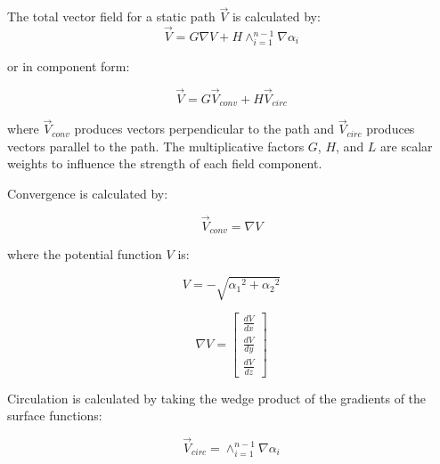 \documentclass[conf]{new-aiaa}
\begin{document}

The total vector field for a static path $\overrightarrow{V}$ is calculated by:
\begin{equation}\label{eq:GVF}
\overrightarrow{V} = G \nabla V + H \wedge_{i=1}^{n-1}\nabla\alpha_i
\end{equation}

or in component form:

\begin{equation}\label{eq:simpleGVF}
\overrightarrow{V} = G\overrightarrow{V}_{conv} + H\overrightarrow{V}_{circ} 
\end{equation}	

where $\overrightarrow{V}_{conv}$ produces vectors perpendicular to the path and $\overrightarrow{V}_{circ}$ produces vectors parallel to the path. The multiplicative factors $G$, $H$, and $L$ are scalar weights to influence the strength of each field component.

Convergence is calculated by:

\begin{equation}
\overrightarrow{V}_{conv} = \nabla V  
\label{convOnly}
\end{equation}

where the potential function $V$ is:

\begin{equation}
V = -\sqrt{{\alpha_1}^2 + {\alpha_2}^2}
\end{equation}

\begin{equation}
\label{eq:gradV}
\nabla V =\begin{bmatrix}
\frac{dV}{dx} \\
\frac{dV}{dy} \\
\frac{dV}{dz}
\end{bmatrix}
\end{equation}



Circulation is calculated by taking the wedge product of the gradients of the surface functions:

\begin{equation}
\overrightarrow{V}_{circ} =  \wedge_{i=1}^{n-1}\nabla\alpha_i 
\label{circOnly}
\end{equation}
\end{document}
